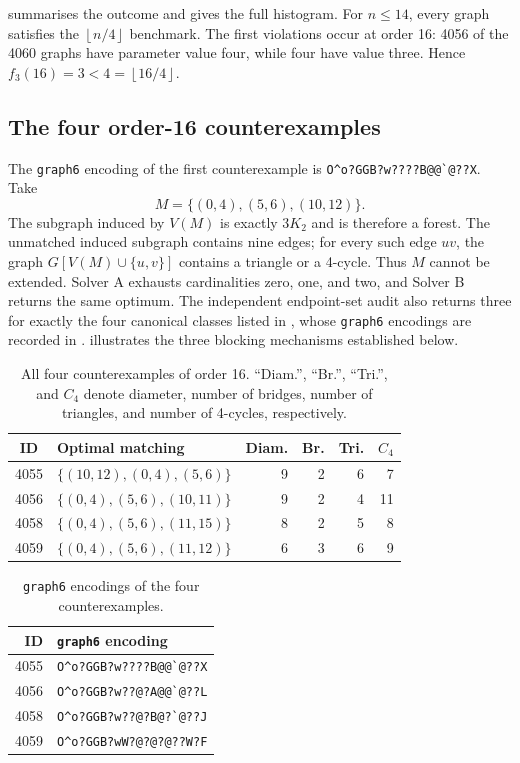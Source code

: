 \documentclass[smallextended,natbib,nospthms]{svjour3}
\theoremstyle{definition}
\theoremstyle{remark}
\newcommand{\floor}[1]{\left\lfloor #1\right\rfloor}
\begin{document}
 summarises the outcome and  gives the
full histogram. For $n\leq 14$, every graph satisfies the
$\floor{n/4}$ benchmark. The first violations occur
at order 16: 4056 of the 4060 graphs have parameter value four, while four
have value three. Hence $f_3(16)=3<4=\floor{16/4}$.

\subsection{The four order-16 counterexamples}

The \texttt{graph6} encoding of the first counterexample is
\verb|O^o?GGB?w????B@@`@??X|.
Take
\[
  M=\{(0,4),(5,6),(10,12)\}.
\]
The subgraph induced by $V(M)$ is exactly $3K_2$ and is therefore a forest.
The unmatched induced subgraph contains nine edges; for every such edge
$uv$, the graph $G[V(M)\cup\{u,v\}]$ contains a triangle or a 4-cycle.
Thus $M$ cannot be extended. Solver A exhausts cardinalities zero, one, and
two, and Solver B returns the same optimum. The independent endpoint-set
audit also returns three for exactly the four canonical classes listed in
, whose \texttt{graph6} encodings are recorded in
.  illustrates the three blocking
mechanisms established below.

\begin{table}[t]
\centering
\caption{All four counterexamples of order 16. ``Diam.'', ``Br.'',
``Tri.'', and $C_4$ denote diameter, number of bridges, number of triangles,
and number of 4-cycles, respectively.}
\label{tab:counterexamples}
\begin{tabular}{clrrrr}
\toprule
ID & Optimal matching & Diam. & Br. & Tri. & $C_4$\\
\midrule
4055 & $\{(10,12),(0,4),(5,6)\}$  & 9 & 2 & 6 & 7\\
4056 & $\{(0,4),(5,6),(10,11)\}$  & 9 & 2 & 4 & 11\\
4058 & $\{(0,4),(5,6),(11,15)\}$  & 8 & 2 & 5 & 8\\
4059 & $\{(0,4),(5,6),(11,12)\}$  & 6 & 3 & 6 & 9\\
\bottomrule
\end{tabular}
\end{table}

\begin{table}[t]
\centering
\caption{\texttt{graph6} encodings of the four counterexamples.}
\label{tab:graph6}
\begin{tabular}{rl}
\toprule
ID & \texttt{graph6} encoding\\
\midrule
4055 & \verb|O^o?GGB?w????B@@`@??X|\\
4056 & \verb|O^o?GGB?w??@?A@@`@??L|\\
4058 & \verb|O^o?GGB?w??@?B@?`@??J|\\
4059 & \verb|O^o?GGB?wW?@?@?@??W?F|\\
\bottomrule
\end{tabular}
\end{table}
\end{document}
